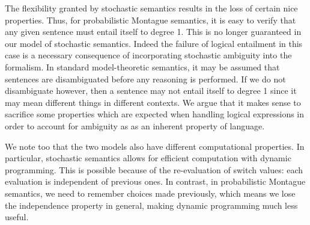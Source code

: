 \documentclass[11pt]{article}
\theoremstyle{definition}
\begin{document}
The flexibility granted by stochastic semantics results
in the loss of certain nice properties. Thus, for
probabilistic Montague semantics, it is easy to verify that any given sentence must entail itself to degree 1. This is
no longer guaranteed in our model of stochastic semantics. Indeed
the failure of logical entailment in this case is a necessary consequence of incorporating stochastic
ambiguity into the formalism. In standard model-theoretic semantics,
it may be assumed that sentences are disambiguated before any reasoning is
performed. If we do not disambiguate however, then a sentence may not entail itself to degree 1 since it may mean different things
in different contexts. We argue that it makes sense to
sacrifice some properties which are expected when handling logical
expressions in order to account for ambiguity as
as an inherent property of language.

We note too that the two models also have different computational properties.
In particular, stochastic semantics allows for efficient computation with dynamic
programming. This is possible because of the re-evaluation of switch
values: each evaluation is independent of previous ones. In contrast,
in probabilistic Montague semantics, we need to remember choices made
previously, which means we lose the independence property in general,
making dynamic programming much less useful. 





\end{document}

